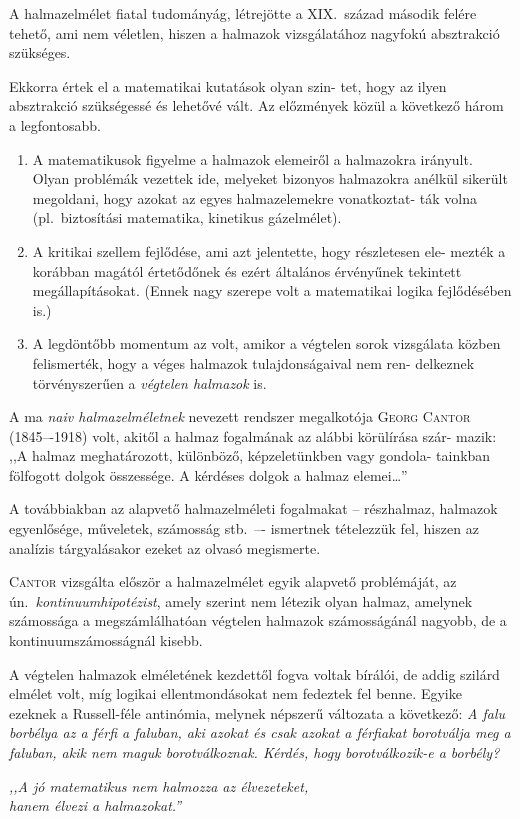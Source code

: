 \documentclass[a4paper,12pt]{article}
\begin{document}
A halmazelmélet fiatal tudományág, létrejötte a XIX.~század második
felére tehető, ami nem véletlen, hiszen a halmazok vizsgálatához nagyfokú
absztrakció szükséges.

Ekkorra értek el a matematikai kutatások olyan szin-
tet, hogy az ilyen absztrakció szükségessé és lehetővé vált. Az előzmények
közül a következő három a legfontosabb.

\begin{enumerate}
\item A matematikusok figyelme a halmazok elemeiről a halmazokra irányult.
Olyan problémák vezettek ide, melyeket bizonyos halmazokra anélkül
sikerült megoldani, hogy azokat az egyes halmazelemekre vonatkoztat-
ták volna (pl.~biztosítási matematika, kinetikus gázelmélet).

\item A kritikai szellem fejlődése, ami azt jelentette, hogy részletesen ele-
mezték a korábban magától értetődőnek és ezért általános érvényűnek
tekintett megállapításokat. (Ennek nagy szerepe volt a matematikai
logika fejlődésében is.)

\item A legdöntőbb momentum az volt, amikor a végtelen sorok vizsgálata
közben felismerték, hogy a véges halmazok tulajdonságaival nem ren-
delkeznek törvényszerűen a \emph{végtelen halmazok} is.
\end{enumerate}

A ma \emph{naiv halmazelméletnek} nevezett rendszer megalkotója \textsc{Georg Cantor}
(1845–-1918) volt, akitől a halmaz fogalmának az alábbi körülírása szár-
mazik: ,,A halmaz meghatározott, különböző, képzeletünkben vagy gondola-
tainkban fölfogott dolgok összessége. A kérdéses dolgok a halmaz elemei\dots''

A továbbiakban az alapvető halmazelméleti fogalmakat -- részhalmaz, halmazok
egyenlősége, műveletek, számosság stb.~–- ismertnek tételezzük fel, hiszen
az analízis tárgyalásakor ezeket az olvasó megismerte.

\textsc{Cantor} vizsgálta először a halmazelmélet egyik alapvető problémáját, az
ún.~\emph{kontinuumhipotézist}, amely szerint nem létezik olyan halmaz, amelynek
számossága a megszámlálhatóan végtelen halmazok számosságánál nagyobb,
de a kontinuumszámosságnál kisebb.

\bigskip
A végtelen halmazok elméletének kezdettől fogva voltak bírálói, de addig
szilárd elmélet volt, míg logikai ellentmondásokat nem fedeztek fel benne.
Egyike ezeknek a Russell-féle antinómia, melynek népszerű változata a következő:
\emph{A falu borbélya az a férfi a faluban, aki azokat és csak azokat a
férfiakat borotválja meg a faluban, akik nem maguk borotválkoznak. Kérdés,
hogy borotválkozik-e a borbély?}

\begin{flushright}
{\footnotesize
\emph{,,A jó matematikus nem halmozza az élvezeteket,\\hanem élvezi a halmazokat.''}
}
\end{flushright}
\end{document}
